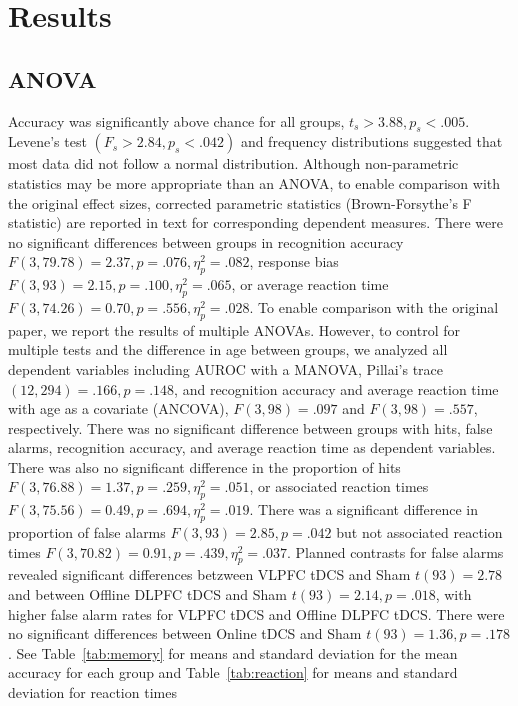\documentclass[10pt,letterpaper]{article}
\begin{document}
\section{Results}

\subsection{ANOVA}
Accuracy was significantly above chance for all groups, \(t_s>3.88, p_s<.005\). Levene’s test \((F_s>2.84,  p_s<.042)\) and frequency distributions suggested that most data did not follow a normal distribution. Although non-parametric statistics may be more appropriate than an ANOVA, to enable comparison with the original effect sizes, corrected parametric statistics (Brown-Forsythe’s F statistic) are reported in text for corresponding dependent measures. 
There were no significant differences between groups in recognition accuracy \(F(3,79.78) = 2.37, p = .076,  \eta^2_p = .082\), response bias \(F(3,93) = 2.15, p = .100, \eta^2_p = .065\), or average reaction time \(F(3,74.26) = 0.70, p = .556,  \eta^2_p = .028\). 
To enable comparison with the original paper, we report the results of multiple ANOVAs. However, to control for multiple tests and the difference in age between groups, we analyzed all dependent variables including AUROC with a MANOVA, Pillai's trace \((12, 294) = .166, p = .148\), and recognition accuracy and average reaction time with age as a covariate (ANCOVA), \(F(3, 98) = .097\) and \(F(3, 98) = .557\), respectively.
There was no significant difference between groups with hits, false alarms, recognition accuracy, and average reaction time as dependent variables.
There was also no significant difference in the proportion of hits \(F(3,76.88) = 1.37, p = .259,  \eta^2_p = .051\),  or associated reaction times \(F(3,75.56) = 0.49, p = .694,  \eta^2_p = .019\). There was a significant difference in proportion of false alarms \(F(3,93) = 2.85, p = .042\) but not associated reaction times \(F(3,70.82) = 0.91, p = .439,  \eta^2_p = .037\). Planned contrasts for false alarms revealed significant differences betzween VLPFC tDCS and Sham \(t(93) = 2.78\) and between Offline DLPFC tDCS and Sham \(t(93) = 2.14, p = .018\), with higher false alarm rates for VLPFC tDCS and Offline DLPFC tDCS. There were no significant differences between Online tDCS and Sham \(t(93) = 1.36, p = .178\). 
See Table~\ref{tab:memory} for means and standard deviation  for the mean accuracy for each group and Table~\ref{tab:reaction} for means and standard deviation for reaction times
\end{document}
